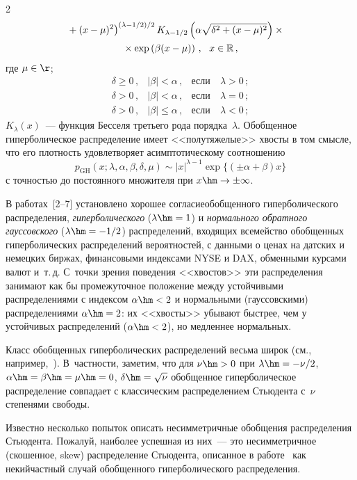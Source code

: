 \begin{multicols}{2}
 \noindent
 \begin{multline*}
\hspace*{-3.5mm}\left. {}+(x-\mu)^2\right)^{(\lambda-1/2)/2}
 K_{\lambda-{1}/{2}}\left(\alpha\sqrt{\delta^2+(x-\mu)^2}\right)
 \times{}\\
 {}\times \exp\left(\beta(x-\mu)\right)\,,\ \ x\in \mathbb{R}\,,
\end{multline*}
где $\mu\in\r$;
$$
\begin{array}{rccc}
  \delta \ge 0\,, & |\beta|<\alpha\,, & {\mbox{если}}\ &
\lambda>0\,;\\[6pt]
           \delta  > 0\,,  & |\beta|<\alpha\,, & {\mbox{если}}\ & \lambda=0\,;\\[6pt]
           \delta  > 0\,,  & |\beta|\le\alpha\,,&{\mbox{если}}\ &\lambda<0\,;
\end{array}
$$
$K_{\lambda}(x)$~--- функция Бесселя третьего рода порядка~$\lambda$. 
Обобщенное гиперболическое распределение имеет
<<полутяжелые>> хвосты в том смысле, что его плот\-ность
удовлетворяет асимптотическому соотношению
$$
p_{\mathrm{GH}}(x;\lambda,\alpha,\beta,\delta,\mu)\sim
|x|^{\lambda-1}\exp\{(\pm\alpha+\beta)x\}
$$ с точностью до
постоянного множителя при $x\hm\to\pm \infty$.

В работах~[2--7] установлено хорошее согласие\linebreak обобщенного
гиперболического распределения, \textit{гиперболического} ($\lambda\hm=1$)
и \textit{нормального обратного гауссовского} ($\lambda\hm=-1/2$)
распределений, входящих в\linebreak семейство обобщенных гиперболических
распределений вероятностей, с данными о ценах на датских и немецких
биржах, финансовыми индексами NYSE и DAX, обменными курсами валют и~т.\,д. 
С~точки зрения поведения <<хвостов>> эти распределения
занимают как бы промежуточное положение между устойчивыми
распределениями с индексом $\alpha\hm<2$ и нормальными (гауссовскими)
распределениями $\alpha\hm=2$: их <<хвосты>> убывают быстрее, чем у
устойчивых распределений ($\alpha\hm<2$), но медленнее нормальных.

Класс обобщенных гиперболических распределений весьма широк (см.,
например,~\cite{Korolev2011}). В~частности, заметим, что для
$\nu\hm>0$ при $\lambda\hm=-{\nu}/{2}$, $\alpha\hm=\beta\hm=\mu\hm=0$,
$\delta\hm=\sqrt{\nu}$ обобщенное гиперболическое распределение
совпадает с классическим распределением Стьюдента с~$\nu$
степенями свободы.

Известно несколько попыток описать несимметричные обобщения
распределения Стьюдента. Пожалуй, наиболее успешная из них~--- это
не\-симметричное (скошенное, skew) распределение Стьюдента,
описанное в работе~\cite{AasHaff2006} как некий\linebreak част\-ный 
 случай
обобщенного гиперболического распределения. 


\end{multicols}
